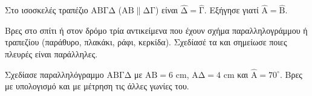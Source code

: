 \ex Στο ισοσκελές τραπέζιο $\mathrm{ΑΒΓΔ}$ ($\mathrm{ΑΒ}\parallel\mathrm{ΔΓ}$) είναι $\hat{\mathrm{Δ}}=\hat{\mathrm{Γ}}$. Εξήγησε γιατί $\hat{\mathrm{Α}}=\hat{\mathrm{Β}}$.


\ex Βρες στο σπίτι ή στον δρόμο τρία αντικείμενα που έχουν σχήμα παραλληλογράμμου ή τραπεζίου (παράθυρο, πλακάκι, ράφι, κερκίδα). Σχεδίασέ τα και σημείωσε ποιες πλευρές είναι παράλληλες.

\ex Σχεδίασε παραλληλόγραμμο $\mathrm{ΑΒΓΔ}$ με $\mathrm{ΑΒ}=6$ cm, $\mathrm{ΑΔ}=4$ cm και $\hat{\mathrm{Α}}=70^\circ$. Βρες με υπολογισμό και με μέτρηση τις άλλες γωνίες του.
